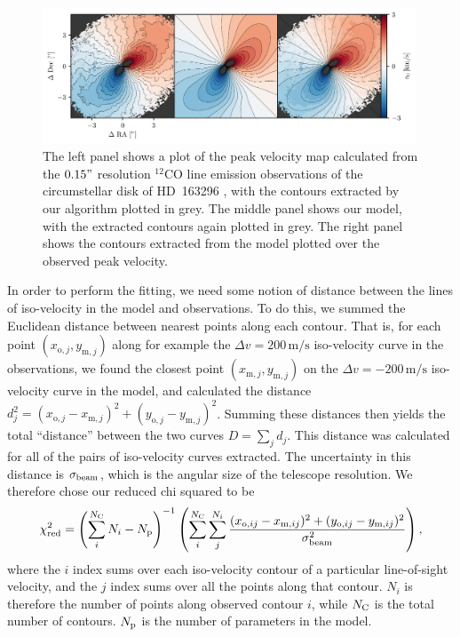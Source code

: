 \begin{figure}
    \centering
    \includegraphics[width = 0.99\textwidth]{figures/thesis_plot_model_obs.pdf}
    \caption{The left panel shows a plot of the peak velocity map calculated from the $0.15"$ resolution $^{12}$CO line emission observations of the circumstellar disk of HD~163296 \citep{oberg2021}, with the contours extracted by our algorithm plotted in grey. The middle panel shows our model, with the extracted contours again plotted in grey. The right panel shows the contours extracted from the model plotted over the observed peak velocity.}
    \label{fig:conts_obs_model}
\end{figure}

In order to perform the fitting, we need some notion of distance between the lines of iso-velocity in the model and observations.
To do this, we summed the Euclidean distance between nearest points along each contour.
That is, for each point $(x_{\mathrm{o},j},y_{\mathrm{m},j})$ along for example the $\Delta v = 200 \, \mathrm{m/s}$ iso-velocity curve in the observations, we found the closest point $(x_{\mathrm{m},j},y_{\mathrm{m},j})$ on the $\Delta v = -200 \, \mathrm{m/s}$ iso-velocity curve in the model, and calculated the distance $d_j^2 = (x_{\mathrm{o},j} - x_{\mathrm{m},j})^2 + (y_{\mathrm{o},j} - y_{\mathrm{m},j})^2$.
Summing these distances then yields the total ``distance'' between the two curves $D = \sum_j d_j$.
This distance was calculated for all of the pairs of iso-velocity curves extracted.
The uncertainty in this distance is $\sigma_{\rm beam}$, which is the angular size of the telescope resolution.
We therefore chose our reduced chi squared to be
\begin{align}
    \chi_{\rm red}^2 = \left( \sum_i^{N_{\rm C}} N_i - N_{\rm p} \right)^{-1} \left( \sum_{i}^{N_{\rm C}} \sum_{j}^{N_i} \frac{(x_{\mathrm{o},ij} - x_{\mathrm{m},ij})^2 + (y_{\mathrm{o},ij} - y_{\mathrm{m},ij})^2}{\sigma_{\rm beam}^2} \right),
\end{align}
where the $i$ index sums over each iso-velocity contour of a particular line-of-sight velocity, and the $j$ index sums over all the points along that contour.
$N_i$ is therefore the number of points along observed contour $i$, while $N_{\rm C}$ is the total number of contours.
$N_{\rm p}$ is the number of parameters in the model.

